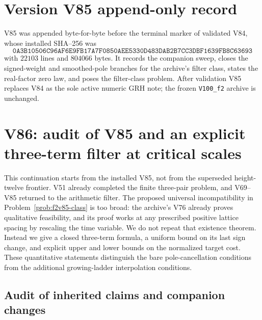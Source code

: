 \documentclass[11pt]{article}
\theoremstyle{definition}
\theoremstyle{remark}
\begin{document}
\section*{Version V85 append-only record}

V85 was appended byte-for-byte before the terminal marker of validated
V84, whose installed SHA--256 was
\[
 \texttt{0A3B10506C96AF6E9FB17A7F0850AEE5}
 \allowbreak\texttt{330D483DAB2B7CC3DBF1639FB8C63693}
\]
with \(22103\) lines and \(804066\) bytes.  It records the companion
sweep, closes the signed-weight and smoothed-pole branches for the
archive's filter class, states the real-factor zero law, and poses the
filter-class problem.  After validation V85 replaces V84 as the sole
active numeric GRH note; the frozen \texttt{V100\_f2} archive is
unchanged.



\clearpage
\section{V86: audit of V85 and an explicit three-term filter at critical scales}
\label{sec:f2v86-three-term}
\begingroup
\setcounter{equation}{0}
\renewcommand{\theequation}{N86.\arabic{equation}}
\renewcommand{\theHequation}{f2v86.\arabic{equation}}

This continuation starts from the installed V85, not from the superseded
height-twelve frontier.  V51 already completed the finite three-pair
problem, and V69--V85 returned to the arithmetic filter.  The proposed
universal incompatibility in Problem~\ref{prob:f2v85-class} is too broad:
the archive's V76 already proves qualitative feasibility, and its proof
works at any prescribed positive lattice spacing by rescaling the time
variable.  We do not repeat that existence theorem.  Instead we give a
closed three-term formula, a uniform bound on its last sign change, and
explicit upper and lower bounds on the normalized target cost.  These
quantitative statements distinguish the bare pole-cancellation conditions
from the additional growing-ladder interpolation conditions.

\subsection{Audit of inherited claims and companion changes}
\end{document}
